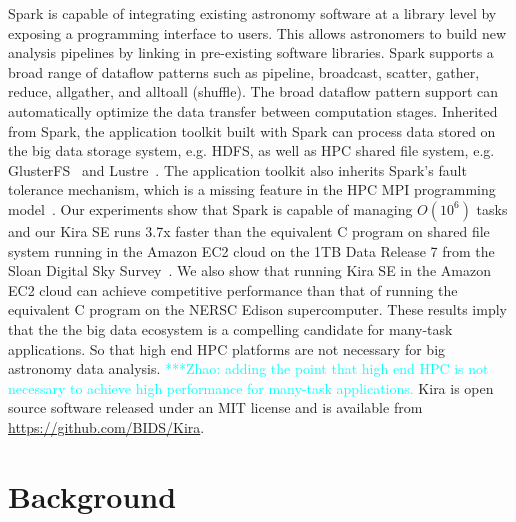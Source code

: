 \documentclass[10pt, conference, compsocconf]{IEEEtran}
\newcommand{\zhaonote}[1]{{\textcolor{cyan}    { ***Zhao:      #1 }}}
\newcommand{\franknote}[1]{{\textcolor{green}    { ***Frank:      #1 }}}
\newcommand{\zhaonote}[1]{}
\newcommand{\franknote}[1]{}
\begin{document}

Spark is capable of integrating existing astronomy software at a library level by exposing a programming interface to users.
This allows astronomers to build new analysis pipelines by linking in pre-existing software libraries.
Spark supports a broad range of dataflow patterns such as pipeline, broadcast, scatter, gather, reduce, allgather, 
and alltoall (shuffle). The broad dataflow pattern support can automatically optimize the data transfer between computation stages.
Inherited from Spark, the application toolkit built with Spark can process data stored on the big data storage system, e.g. HDFS\cite{shvachko10}, 
as well as HPC shared file system, e.g. GlusterFS~\cite{davies13} and Lustre~\cite{donovan03}.
The application toolkit also inherits Spark's fault tolerance mechanism, which is a missing feature in the HPC MPI programming model~\cite{gropp96}.
Our experiments show that Spark is capable of managing $O(10^6)$ tasks and our Kira SE runs 3.7x faster than the equivalent C program on shared file system running in the Amazon EC2 cloud on the 1TB Data Release 7 from the Sloan Digital Sky Survey~\cite{york00}. 
We also show that running Kira SE in the Amazon EC2 cloud can achieve competitive performance than that of running the equivalent C program on the NERSC Edison supercomputer. 
These results imply that the the big data ecosystem is a compelling candidate for many-task applications. 
So that high end HPC platforms are not necessary for big astronomy data analysis.
\zhaonote{adding the point that high end HPC is not necessary to achieve high performance for many-task applications.}
Kira is open source software released under an MIT license and is available from \linebreak \url{https://github.com/BIDS/Kira}.



\section{Background}
\label{sec:Background}
\end{document}
